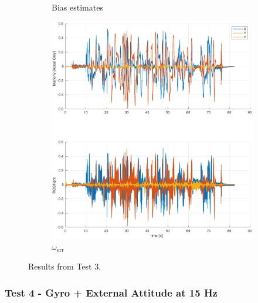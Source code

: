 \documentclass[a4paper]{article}
\begin{document}
\begin{figure}[H]
\begin{subfigure}[t]{0.31\textwidth}
    \caption{Bias estimates}
    \label{fig:scf_est}
  \end{subfigure}\hfill
  \begin{subfigure}[t]{0.31\textwidth}
    \includegraphics[width=\textwidth]{werr_accel_ext100.pdf}
    \caption{$\omega_\text{err}$}
    \label{fig:scf_bode}
  \end{subfigure}
  \caption{Results from Test 3.}
  \label{fig:scf}
\end{figure}

\subsubsection*{Test 4 - Gyro + External Attitude at 15 Hz}
\end{document}
